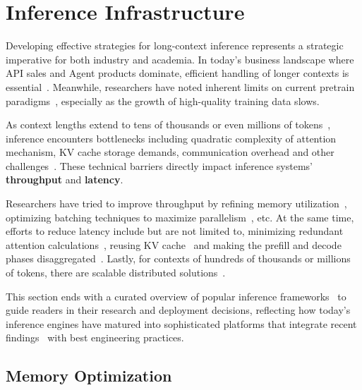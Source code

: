 \section{Inference Infrastructure}\label{sec7}



Developing effective strategies for long-context inference represents a strategic imperative for both industry and academia. In today's business landscape where API sales and Agent products dominate, efficient handling of longer contexts is essential~\citep{Google2024why-do-they-matter, koh2024visualwebarena}. Meanwhile, researchers have noted inherent limits on current pretrain paradigms~\citep{reuters2024Ilya}, especially as the growth of high-quality training data slows. 

As context lengths extend to tens of thousands or even millions of tokens~\citep{anthropic2024claude2, reid2024gemini}, inference encounters bottlenecks including quadratic complexity of attention mechanism, KV cache storage demands, communication overhead and other challenges~\citep{li2024llm, yuan2024llm}. These technical barriers directly impact inference systems' \textbf{throughput} and \textbf{latency}.

Researchers have tried to improve throughput by refining memory utilization~\citep{sheng2023flexgen}, optimizing batching techniques to maximize parallelism~\citep{anyscale2024selective}, etc. At the same time, efforts to reduce latency include but are not limited to, minimizing redundant attention calculations~\citep{jiang2024minference}, reusing KV cache~\citep{zheng2024sglang} and making the prefill and decode phases disaggregated~\citep{jin2024p}. Lastly, for contexts of hundreds of thousands or millions of tokens, there are scalable distributed solutions~\citep{fang2024uspunifiedsequenceparallelism, lin2024infinite, wu2024loongserve}.

This section ends with a curated overview of popular inference frameworks~\citep{kwon2023efficient, 2023lmdeploy, zheng2024sglang, huggingface2024huggingfaceTGI, NVIDIA2024tensorrt-llm} to guide readers in their research and deployment decisions, reflecting how today's inference engines have matured into sophisticated platforms that integrate recent findings~\citep{Gyeong280922Orca, daoflashattention, dao2022flashattention, agrawal2024taming, jin2024p} with best engineering practices.

\subsection{Memory Optimization}\label{sec7_1}

